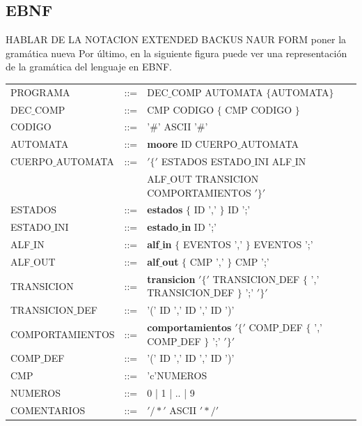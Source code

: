 \documentclass[12pt,a4paper]{article}
\begin{document}
\subsection{EBNF}
HABLAR DE LA NOTACION EXTENDED BACKUS NAUR FORM poner la gramática nueva
Por último, en la siguiente figura puede ver una representación de la gramática del lenguaje en EBNF.

			\begin{center}
			\begin{tabular}{lcl}
	

				PROGRAMA & ::= & DEC$\_$COMP AUTOMATA $\{$AUTOMATA$\}$ \\ 
				 
				
				DEC$\_$COMP & ::= &CMP  CODIGO $\{$ CMP CODIGO $\}$ \\ 
			
				CODIGO 	&::= &'$\#$' ASCII '$\#$' \\ 
				
				AUTOMATA & ::= & \textbf{moore} ID CUERPO$\_$AUTOMATA \\
				
			
				CUERPO$\_$AUTOMATA	& ::= & $'\{'$ ESTADOS ESTADO$\_$INI ALF$\_$IN  \\ 
				
					& &  ALF$\_$OUT TRANSICION COMPORTAMIENTOS $'\}'$ \\ 
				
				ESTADOS	& ::= &   \textbf{estados} $\{$ ID ',' $\}$ ID ';'\\ 
				
				 ESTADO$\_$INI &::= & \textbf{estado$\_$in} ID ';'\\ 
				 
				ALF$\_$IN &::= & \textbf{alf$\_$in}  $\{$ EVENTOS ',' $\}$ EVENTOS ';' \\ 
				
				ALF$\_$OUT & ::= &\textbf{alf$\_$out}  $\{$ CMP ',' $\}$ CMP ';'  \\ 
				
				TRANSICION 	 & ::= & \textbf{transicion} $'\{'$ TRANSICION$\_$DEF $\{$ ',' TRANSICION$\_$DEF  $\}$ ';' $'\}'$ \\ 
				
				TRANSICION$\_$DEF & ::= & '(' ID ',' ID ',' ID ')' \\ 
			
				
				COMPORTAMIENTOS	 & ::= &  \textbf{comportamientos} $'\{'$ COMP$\_$DEF $\{$ ',' COMP$\_$DEF $\}$ ';' $'\}'$\\ 
				
				COMP$\_$DEF &  ::= & '(' ID ',' ID ',' ID ')' \\ 
				
				
				CMP  & ::= & 'c'NUMEROS \\ 
				
				NUMEROS &::= & 0 | 1 | .. | 9 \\ 
				
				COMENTARIOS & ::=  & $'/\ast'$ ASCII $'\ast/'$ \\
				
				
			\end{tabular} 	
		\end{center}
	
\end{document}
